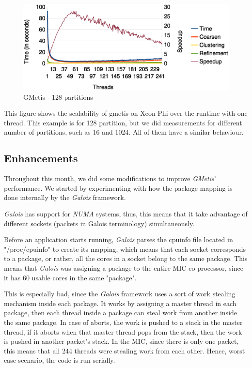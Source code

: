 \documentclass[abstract=on,9pt,twocolumn]{scrartcl}
\begin{document}
\begin{center}
\begin{figure}[htb]
    \includegraphics[width=\columnwidth]{img/gmetis128.eps}
    \caption{GMetis - 128 partitions}
    \label{gmetis128}
\end{figure}
\end{center}

This figure shows the scalability of gmetis on Xeon Phi over the runtime
with one thread. This example is for 128 partition, but we did
measurements for different number of partitions, such as 16 and 1024. All
of them have a similar behaviour.


\subsection{Enhancements}

Throughout this month, we did some modifications to improve
\textit{GMetis}' performance. We started by experimenting with how the package mapping
is done internally by the \textit{Galois} framework.

\textit{Galois} has support for \textit{NUMA} systems, thus, this means that
it take advantage of different sockets (packets in Galois terminology) simultaneously.

Before an application starts running, \textit{Galois} parses the
cpuinfo file located in "/proc/cpuinfo" to create its mapping, which means that each socket
corresponds to a package, or rather, all the cores in a socket belong to the same package.
This means that \textit{Galois} was assigning a package to the entire MIC co-processor, since it has 60 usable cores in the same "package".

This is especially bad, since the \textit{Galois} framework uses a sort of work stealing mechanism inside each package. It works by assigning a master thread in each package, then each thread inside a package can steal work from another inside the same package. In case of aborts, the work is pushed to a stack in the master thread, if it aborts when that master thread pops from the stack, then the work is pushed in another packet's stack. In the MIC, since there is only one packet, this means that all 244 threads were stealing work from each other. Hence, worst case scenario, the code is run serially. 
\end{document}
